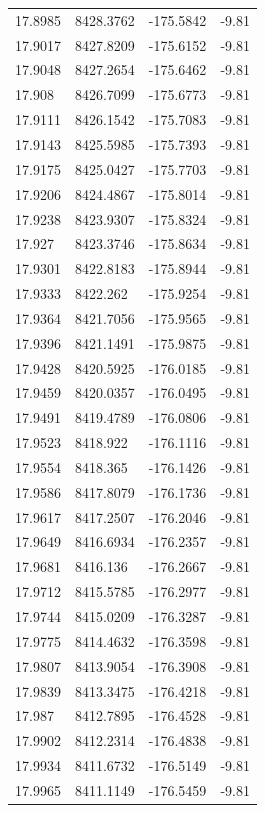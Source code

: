 \begin{table}[H]
\begin{tabular}{llll}
17.8985 & 8428.3762 & -175.5842 & -9.81 \\
17.9017 & 8427.8209 & -175.6152 & -9.81 \\
17.9048 & 8427.2654 & -175.6462 & -9.81 \\
17.908 & 8426.7099 & -175.6773 & -9.81 \\
17.9111 & 8426.1542 & -175.7083 & -9.81 \\
17.9143 & 8425.5985 & -175.7393 & -9.81 \\
17.9175 & 8425.0427 & -175.7703 & -9.81 \\
17.9206 & 8424.4867 & -175.8014 & -9.81 \\
17.9238 & 8423.9307 & -175.8324 & -9.81 \\
17.927 & 8423.3746 & -175.8634 & -9.81 \\
17.9301 & 8422.8183 & -175.8944 & -9.81 \\
17.9333 & 8422.262 & -175.9254 & -9.81 \\
17.9364 & 8421.7056 & -175.9565 & -9.81 \\
17.9396 & 8421.1491 & -175.9875 & -9.81 \\
17.9428 & 8420.5925 & -176.0185 & -9.81 \\
17.9459 & 8420.0357 & -176.0495 & -9.81 \\
17.9491 & 8419.4789 & -176.0806 & -9.81 \\
17.9523 & 8418.922 & -176.1116 & -9.81 \\
17.9554 & 8418.365 & -176.1426 & -9.81 \\
17.9586 & 8417.8079 & -176.1736 & -9.81 \\
17.9617 & 8417.2507 & -176.2046 & -9.81 \\
17.9649 & 8416.6934 & -176.2357 & -9.81 \\
17.9681 & 8416.136 & -176.2667 & -9.81 \\
17.9712 & 8415.5785 & -176.2977 & -9.81 \\
17.9744 & 8415.0209 & -176.3287 & -9.81 \\
17.9775 & 8414.4632 & -176.3598 & -9.81 \\
17.9807 & 8413.9054 & -176.3908 & -9.81 \\
17.9839 & 8413.3475 & -176.4218 & -9.81 \\
17.987 & 8412.7895 & -176.4528 & -9.81 \\
17.9902 & 8412.2314 & -176.4838 & -9.81 \\
17.9934 & 8411.6732 & -176.5149 & -9.81 \\
17.9965 & 8411.1149 & -176.5459 & -9.81 \\

\end{tabular}
\end{table}
